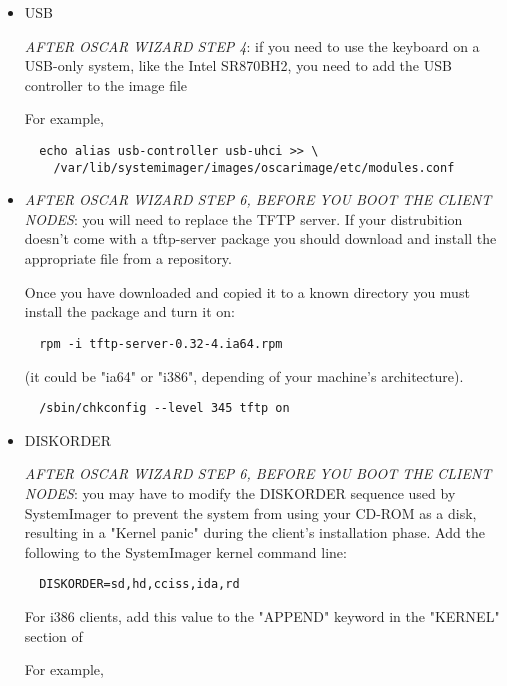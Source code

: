 \begin{itemize}
\item USB

\emph{AFTER OSCAR WIZARD STEP 4}: if you need to use the keyboard on a USB-only
system, like the Intel SR870BH2, you need to add the USB controller to the
image file


For example,

\begin{verbatim}
  echo alias usb-controller usb-uhci >> \
    /var/lib/systemimager/images/oscarimage/etc/modules.conf
\end{verbatim}


\item {}

\emph{AFTER OSCAR WIZARD STEP 6, BEFORE YOU BOOT THE CLIENT NODES}: you will need to
replace the TFTP server.  If your distrubition doesn't come with a tftp-server
package you should download and install the appropriate file from a repository.

Once you have downloaded and copied it to a known directory you must install
the package and turn it on:

\begin{verbatim}
  rpm -i tftp-server-0.32-4.ia64.rpm
\end{verbatim}

(it could be "ia64" or "i386", depending of your machine's architecture).

\begin{verbatim}
  /sbin/chkconfig --level 345 tftp on
\end{verbatim}


\item DISKORDER

\emph{AFTER OSCAR WIZARD STEP 6, BEFORE YOU BOOT THE CLIENT NODES}: you may have to
modify the DISKORDER sequence used by SystemImager to prevent the system from
using your CD-ROM as a disk, resulting in a "Kernel panic" during the
client's installation phase.  Add the following to the SystemImager
kernel command line:

\begin{verbatim}
  DISKORDER=sd,hd,cciss,ida,rd
\end{verbatim}

For i386 clients, add this value to the "APPEND" keyword in the "KERNEL"
section of


For example,


\end{itemize}
